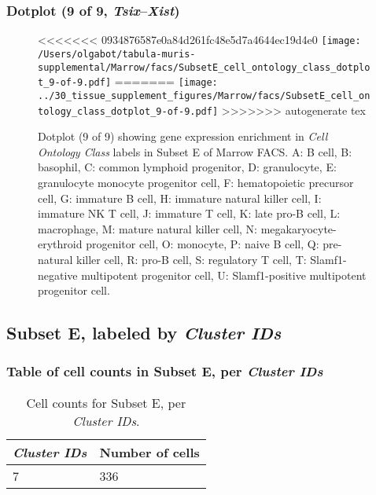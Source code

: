 \clearpage

\subsubsection{Dotplot (9 of 9, \emph{Tsix}--\emph{Xist})}
\begin{figure}[h]
\centering
<<<<<<< 0934876587e0a84d261fc48e5d7a4644ec19d4e0
\texttt{[image: /Users/olgabot/tabula-muris-supplemental/Marrow/facs/SubsetE\_cell\_ontology\_class\_dotplot\_9-of-9.pdf]}
=======
\texttt{[image: ../30\_tissue\_supplement\_figures/Marrow/facs/SubsetE\_cell\_ontology\_class\_dotplot\_9-of-9.pdf]}
>>>>>>> autogenerate tex

\caption{ Dotplot (9 of 9)  showing gene expression enrichment in \emph{Cell Ontology Class} labels in Subset E of Marrow FACS. A: B cell, B: basophil, C: common lymphoid progenitor, D: granulocyte, E: granulocyte monocyte progenitor cell, F: hematopoietic precursor cell, G: immature B cell, H: immature natural killer cell, I: immature NK T cell, J: immature T cell, K: late pro-B cell, L: macrophage, M: mature natural killer cell, N: megakaryocyte-erythroid progenitor cell, O: monocyte, P: naive B cell, Q: pre-natural killer cell, R: pro-B cell, S: regulatory T cell, T: Slamf1-negative multipotent progenitor cell, U: Slamf1-positive multipotent progenitor cell.}
\end{figure}


\clearpage

\subsection{Subset E, labeled by \emph{Cluster IDs}}
\subsubsection{Table of cell counts in Subset E, per \emph{Cluster IDs}}\begin{table}[h]
\centering
\label{my-label}
\begin{tabular}{@{}ll@{}}
\toprule

\emph{Cluster IDs}& Number of cells \\ \midrule
7 & 336 \\
\bottomrule
\end{tabular}
\caption{Cell counts for Subset E, per \emph{Cluster IDs}.}
\end{table}

\clearpage
